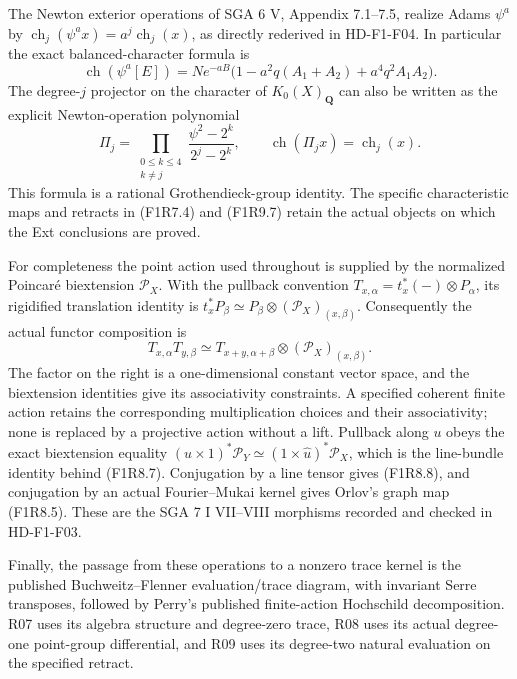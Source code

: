 The Newton exterior operations of SGA 6 V, Appendix 7.1--7.5,
realize Adams $\psi^a$ by
$\operatorname{ch}_j(\psi^a x)=a^j\operatorname{ch}_j(x)$,
as directly rederived in HD-F1-F04. In particular the exact
balanced-character formula is
\[
 \operatorname{ch}(\psi^a[E])
      =N e^{-aB}\bigl(1-a^2q(A_1+A_2)+a^4q^2A_1A_2\bigr).
 \tag{F1R9.10}
\]
The degree-$j$ projector on the character of $K_0(X)_{\mathbf Q}$
can also be written as the explicit Newton-operation polynomial
\[
 \Pi_j=\prod_{\substack{0\le k\le4\\k\ne j}}
           \frac{\psi^2-2^k}{2^j-2^k},\qquad
 \operatorname{ch}(\Pi_jx)=\operatorname{ch}_j(x).
 \tag{F1R9.11}
\]
This formula is a rational Grothendieck-group identity. The
specific characteristic maps and retracts in (F1R7.4) and
(F1R9.7) retain the actual objects on which the Ext conclusions
are proved.

For completeness the point action used throughout is supplied
by the normalized Poincar\'e biextension $\mathcal P_X$.
With the pullback convention $T_{x,\alpha}=t_x^*(-)\otimes P_\alpha$,
its rigidified translation identity is
$t_x^*P_\beta\simeq P_\beta\otimes(\mathcal P_X)_{(x,\beta)}$.
Consequently the actual functor composition is
\[
 T_{x,\alpha}T_{y,\beta}
   \simeq T_{x+y,\alpha+\beta}
                     \otimes(\mathcal P_X)_{(x,\beta)}.
 \tag{F1R9.12}
\]
The factor on the right is a one-dimensional constant vector
space, and the biextension identities give its associativity
constraints. A specified coherent finite action retains the
corresponding multiplication choices and their associativity;
none is replaced by a projective action without a lift.
Pullback along $u$ obeys the exact biextension equality
$(u\times1)^*\mathcal P_Y\simeq(1\times\widehat u)^*\mathcal P_X$,
which is the line-bundle identity behind (F1R8.7).
Conjugation by a line tensor gives (F1R8.8), and conjugation by
an actual Fourier--Mukai kernel gives Orlov's graph map
(F1R8.5). These are the SGA 7 I VII--VIII morphisms recorded
and checked in HD-F1-F03.

Finally, the passage from these operations to a nonzero trace
kernel is the published Buchweitz--Flenner evaluation/trace
diagram, with invariant Serre transposes, followed by Perry's
published finite-action Hochschild decomposition. R07 uses its
algebra structure and degree-zero trace, R08 uses its actual
degree-one point-group differential, and R09 uses its
degree-two natural evaluation on the specified retract.
